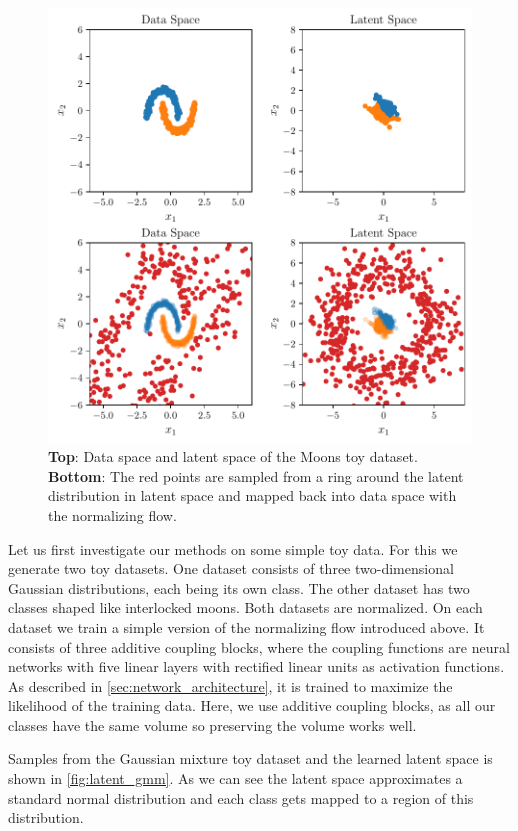 \begin{figure}[htpb]
	\centering
        \includegraphics{figures/toy_example/moons/latent_mapping.pdf}
        \caption{\textbf{Top}: Data space and latent space of the Moons
        toy dataset. \textbf{Bottom}: The red points are sampled from a
    ring around the latent distribution in latent space and mapped back into
data space with the normalizing flow.}%
	\label{fig:latent_moons}
\end{figure}

Let us first investigate our methods on some simple toy data. For this we
generate two toy datasets. One dataset consists of three two-dimensional
Gaussian distributions, each being its own class. The other dataset has two
classes shaped like interlocked moons. Both datasets are normalized. On each
dataset we train a simple version of the normalizing flow introduced above. It
consists of three additive coupling blocks, where the coupling
functions are neural networks with five linear layers with rectified linear
units as activation functions. As described in
\autoref{sec:network_architecture}, it is trained to maximize the likelihood of
the training data. Here, we use additive coupling blocks, as all our classes
have the same volume so preserving the volume works well.

Samples from the Gaussian mixture toy dataset and the learned latent space
is shown in \autoref{fig:latent_gmm}. As we can see
the latent space approximates a standard normal distribution and each class
gets mapped to a region of this distribution.

